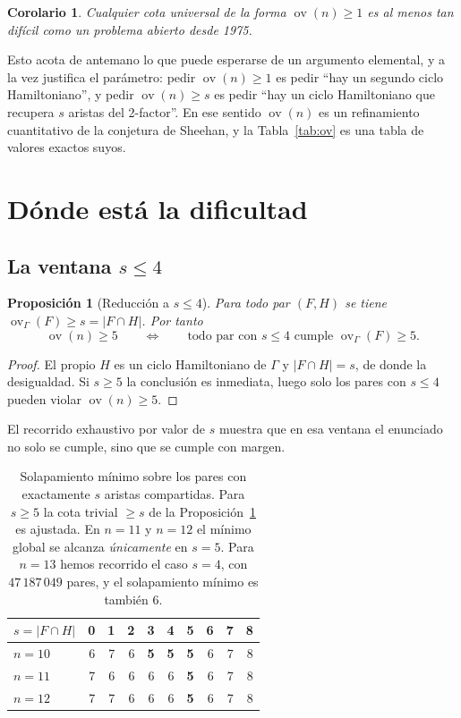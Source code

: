 \documentclass[11pt,a4paper]{article}
\newtheorem{proposicion}[teorema]{Proposición}
\newtheorem{corolario}[teorema]{Corolario}
\theoremstyle{definition}
\theoremstyle{remark}
\newcommand{\ov}{\operatorname{ov}}
\begin{document}
\begin{corolario}\label{cor:muro}
Cualquier cota universal de la forma $\ov(n)\ge1$ es al menos tan difícil como un problema abierto desde 1975.
\end{corolario}

Esto acota de antemano lo que puede esperarse de un argumento elemental, y a la vez justifica el parámetro: pedir $\ov(n)\ge1$ es pedir ``hay un segundo ciclo Hamiltoniano'', y pedir $\ov(n)\ge s$ es pedir ``hay un ciclo Hamiltoniano que recupera $s$ aristas del 2-factor''. En ese sentido $\ov(n)$ es un refinamiento cuantitativo de la conjetura de Sheehan, y la Tabla~\ref{tab:ov} es una tabla de valores exactos suyos.

\section{Dónde está la dificultad}\label{sec:ventana}

\subsection{La ventana \texorpdfstring{$s\le4$}{s <= 4}}

\begin{proposicion}[Reducción a $s\le4$]\label{prop:ventana}
Para todo par $(F,H)$ se tiene $\ov_\Gamma(F)\ge s=|F\cap H|$. Por tanto
\[
\ov(n)\ge5
\qquad\Longleftrightarrow\qquad
\text{todo par con } s\le4 \text{ cumple } \ov_\Gamma(F)\ge5 .
\]
\end{proposicion}

\begin{proof}
El propio $H$ es un ciclo Hamiltoniano de $\Gamma$ y $|F\cap H|=s$, de donde la desigualdad. Si $s\ge5$ la conclusión es inmediata, luego solo los pares con $s\le4$ pueden violar $\ov(n)\ge5$.
\end{proof}

El recorrido exhaustivo por valor de $s$ muestra que en esa ventana el enunciado no solo se cumple, sino que se cumple con margen.

\begin{table}[h]
\centering
\begin{tabular}{lrrrrrrrrr}
\toprule
$s=|F\cap H|$ & 0 & 1 & 2 & 3 & 4 & 5 & 6 & 7 & 8\\
\midrule
$n=10$ & 6 & 7 & 6 & \textbf{5} & \textbf{5} & \textbf{5} & 6 & 7 & 8\\
$n=11$ & 7 & 6 & 6 & 6 & 6 & \textbf{5} & 6 & 7 & 8\\
$n=12$ & 7 & 7 & 6 & 6 & 6 & \textbf{5} & 6 & 7 & 8\\
\bottomrule
\end{tabular}
\caption{Solapamiento mínimo sobre los pares con exactamente $s$ aristas compartidas. Para $s\ge5$ la cota trivial $\ge s$ de la Proposición~\ref{prop:ventana} es ajustada. En $n=11$ y $n=12$ el mínimo global se alcanza \emph{únicamente} en $s=5$. Para $n=13$ hemos recorrido el caso $s=4$, con $47\,187\,049$ pares, y el solapamiento mínimo es también $6$.}\label{tab:pors}
\end{table}
\end{document}
